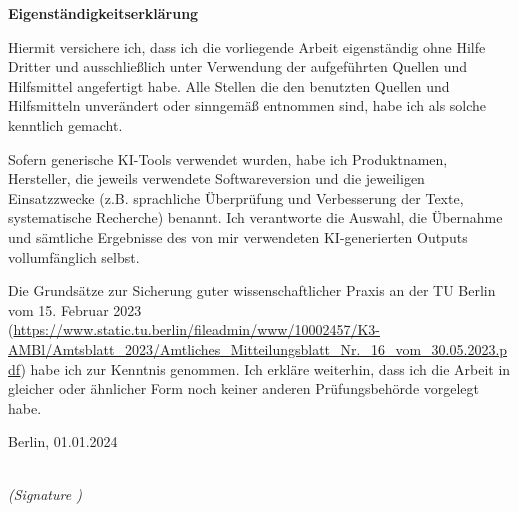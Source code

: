 \newpage

\thispagestyle{empty}
\begin{large}
\noindent
\textbf{Eigenständigkeitserklärung}
\vspace*{1.5cm}

\noindent
Hiermit versichere ich, dass ich die vorliegende Arbeit eigenständig ohne Hilfe Dritter und ausschließlich unter
Verwendung der aufgeführten Quellen und Hilfsmittel angefertigt habe. Alle Stellen die den benutzten Quellen
und Hilfsmitteln unverändert oder sinngemäß entnommen sind, habe ich als solche kenntlich gemacht.
\newline

\noindent
Sofern generische KI-Tools verwendet wurden, habe ich Produktnamen, Hersteller, die jeweils verwendete
Softwareversion und die jeweiligen Einsatzzwecke (z.B. sprachliche Überprüfung und Verbesserung der Texte,
systematische Recherche) benannt. Ich verantworte die Auswahl, die Übernahme und sämtliche Ergebnisse
des von mir verwendeten KI-generierten Outputs vollumfänglich selbst.
\newline

\noindent
Die Grundsätze zur Sicherung guter wissenschaftlicher Praxis an der TU Berlin vom 15. Februar 2023\\
{\normalsize(\url{https://www.static.tu.berlin/fileadmin/www/10002457/K3-AMBl/Amtsblatt_2023/Amtliches_Mitteilungsblatt_Nr._16_vom_30.05.2023.pdf})}
habe ich zur Kenntnis genommen.
Ich erkläre weiterhin, dass ich die Arbeit in gleicher oder ähnlicher Form noch keiner anderen Prüfungsbehörde
vorgelegt habe.
\vspace{2cm}

\noindent
Berlin, 01.01.2024\\ %

\vspace{3cm}

\hspace*{7cm}%
\dotfill\\
\hspace*{8.5cm}%
\textit{(Signature )}

\end{large}
